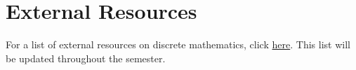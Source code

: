 \documentclass[letterpaper]{inzane_syllabus} %
\begin{document}
\vspace{1cm}
\section{External Resources}

For a list of external resources on discrete mathematics, click  \href{https://github.com/mikewojnowicz/csci246_fall2025/blob/main/LINKS.md}{here}.  This list will be updated throughout the semester.

\vspace{0.4cm}


\end{document}

